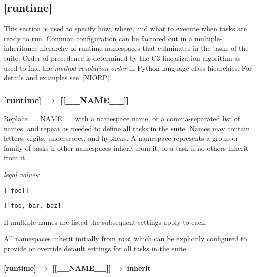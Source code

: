 \subsection{[runtime]}

This section is used to specify how, where, and what to execute when
tasks are ready to run. Common
configuration can be factored out in a multiple-inheritance hierarchy of
runtime namespaces that culminates in the tasks of the suite. Order of
precedence is determined by the C3 linearization algorithm as used to
find the {\em method resolution order} in Python language class
hiearchies. For details and examples see~\ref{NIORP}.

\subsubsection[{[[}\_\_NAME\_\_{]]}]{[runtime] $\rightarrow$ [[\_\_NAME\_\_]]}

Replace \_\_NAME\_\_ with a namespace name, or a comma-separated list of
names, and repeat as needed to define all tasks in the suite. Names may
contain letters, digits, underscores, and hyphens. A namespace
represents a group or family of tasks if other namespaces inherit from
it, or a task if no others inherit from it.


\begin{myitemize}
\item {\em legal values:}
    \begin{myitemize}
        \item \lstinline=[[foo]]=
        \item \lstinline=[[foo, bar, baz]]=
    \end{myitemize}
\end{myitemize}

If multiple names are listed the subsequent settings apply to each.

All namespaces inherit initially from {\em root}, which can be
explicitly configured to provide or override default settings
for all tasks in the suite.

\paragraph[inherit]{[runtime] $\rightarrow$ [[\_\_NAME\_\_]] $\rightarrow$ inherit}

